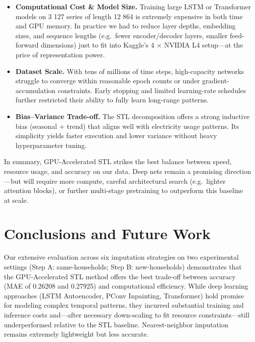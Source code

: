 \documentclass[10pt,twocolumn]{article}
\begin{document}
	\begin{itemize}
		\item \textbf{Computational Cost \& Model Size.} Training large LSTM or Transformer models on 3 127 series of length 12 864 is extremely expensive in both time and GPU memory. In practice we had to reduce layer depths, embedding sizes, and sequence lengths (e.g.\ fewer encoder/decoder layers, smaller feed-forward dimensions) just to fit into Kaggle’s 4 × NVIDIA L4 setup—at the price of representation power.
		\item \textbf{Dataset Scale.} With tens of millions of time steps, high-capacity networks struggle to converge within reasonable epoch counts or under gradient-accumulation constraints. Early stopping and limited learning-rate schedules further restricted their ability to fully learn long-range patterns.
		\item \textbf{Bias–Variance Trade-off.} The STL decomposition offers a strong inductive bias (seasonal + trend) that aligns well with electricity usage patterns. Its simplicity yields faster execution and lower variance without heavy hyperparameter tuning.
	\end{itemize}
	
	In summary, GPU-Accelerated STL strikes the best balance between speed, resource usage, and accuracy on our data. Deep nets remain a promising direction—but will require more compute, careful architectural search (e.g.\ lighter attention blocks), or further multi-stage pretraining to outperform this baseline at scale.
	
	
	\section{Conclusions and Future Work}
	
	Our extensive evaluation across six imputation strategies on two experimental settings (Step A: same-households; Step B: new-households) demonstrates that the GPU-Accelerated STL method offers the best trade-off between accuracy (MAE of 0.26208 and 0.27925) and computational efficiency. While deep learning approaches (LSTM Autoencoder, PConv Inpainting, Transformer) hold promise for modeling complex temporal patterns, they incurred substantial training and inference costs and—after necessary down-scaling to fit resource constraints—still underperformed relative to the STL baseline. Nearest-neighbor imputation remains extremely lightweight but less accurate.
	
\end{document}
